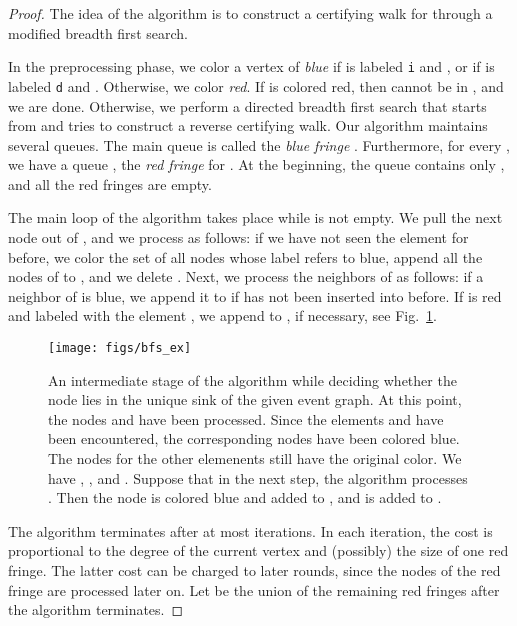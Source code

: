 \documentclass[oribibl,envcountsect,envcountsame]{llncs}
\begin{document}
\begin{proof}
The idea of the algorithm is to construct a certifying walk 
for  through a modified breadth first search. 

In the preprocessing phase, we color a vertex  of  \emph{blue} if  is 
labeled \texttt{i} and , or if  is labeled
\texttt{d} and . Otherwise, we color  \emph{red}. 
If  is colored red, then  cannot be in , and we are done. 
Otherwise, we perform 
a directed breadth first search that starts from  and tries to
construct a reverse certifying walk.
Our algorithm maintains several queues.
The main queue is called the \emph{blue fringe} . Furthermore,
for every , we have a queue , the \emph{red fringe}
for . At the beginning, the queue  contains only , and all
the red fringes are empty.

The main loop of the algorithm takes place while  is not
empty. We pull the next node  out of , and we process
 as follows: if we have not seen the element 
for  before, we color the set  of all nodes 
whose label refers to  blue, append all the nodes of 
 to , and we delete . Next, 
we process the neighbors of  as follows: if a neighbor  of  is blue,
we append it to  if  has not been inserted into  before. If  
is red and labeled with the element , we append  to , 
if necessary, see Fig.~\ref{fig:bfs_ex}. 

\begin{figure}
\begin{center}
\texttt{[image: figs/bfs\_ex]}
\end{center}
\caption{An intermediate stage of the algorithm while deciding whether the 
  node  lies in the unique sink of the given event graph. At 
  this point, the nodes  and  have been processed.
  Since the elements  and  have been encountered, the corresponding
  nodes have been colored blue. The nodes for the other elemenents still
  have the original color. We have , , and 
  .  Suppose that in the next step,
  the algorithm processes . Then the node 
  is colored blue and added to , and  is added to
  .
}
\label{fig:bfs_ex}
\end{figure}


The algorithm terminates after at
most  iterations. In each iteration, the cost is proportional 
to the degree of the current vertex  and (possibly) the size of 
one red fringe. The latter
cost can be charged to later rounds, since the nodes of the red fringe 
are processed later on. Let  be the union of the
remaining red fringes after the algorithm terminates.


\end{proof}
\end{document}
